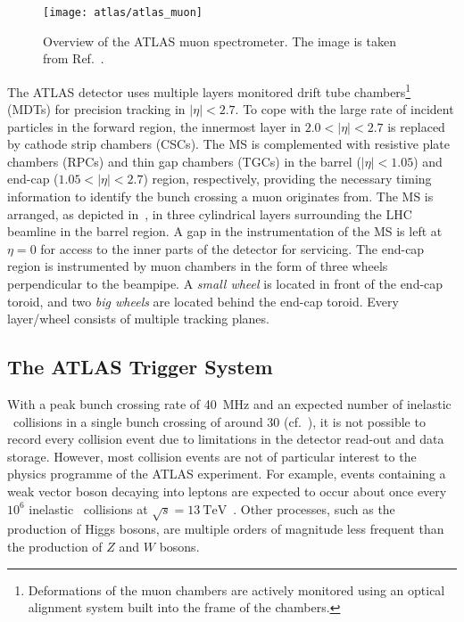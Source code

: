 \begin{figure}[htbp]
  \centering

  \texttt{[image: atlas/atlas\_muon]}

  \caption[Overview of the ATLAS muon spectrometer.]{Overview of the ATLAS muon
    spectrometer. The image is taken from Ref.~\cite{PERF-2007-01}.}%
  \label{fig:atlas_muon_system}
\end{figure}

The ATLAS detector uses multiple layers monitored drift tube
chambers\footnote{Deformations of the muon chambers are actively monitored using
  an optical alignment system built into the frame of the chambers.} (MDTs) for
precision tracking in $|\eta| < 2.7$. To cope with the large rate of incident
particles in the forward region, the innermost layer in $2.0 < |\eta| < 2.7$ is
replaced by cathode strip chambers (CSCs). The MS is complemented with resistive
plate chambers (RPCs) and thin gap chambers (TGCs) in the barrel
($|\eta| < 1.05$) and end-cap ($1.05 < |\eta| < 2.7$) region, respectively,
providing the necessary timing information to identify the bunch crossing a muon
originates from. The MS is arranged, as depicted
in~, in three cylindrical layers surrounding the LHC
beamline in the barrel region. A gap in the instrumentation of the MS is left at
$\eta = 0$ for access to the inner parts of the detector for servicing. The
end-cap region is instrumented by muon chambers in the form of three wheels
perpendicular to the beampipe. A \emph{small wheel} is located in front of the
end-cap toroid, and two \emph{big wheels} are located behind the end-cap
toroid. Every layer/wheel consists of multiple tracking planes.


\subsection{The ATLAS Trigger System}%
\label{sec:atlas_trigger}

With a peak bunch crossing rate of \SI{40}{\mega\hertz} and an expected number
of inelastic \pp~collisions in a single bunch crossing of around \num{30} (cf.\
), it is not possible to record every collision event due
to limitations in the detector read-out and data storage. However, most
collision events are not of particular interest to the physics programme of the
ATLAS experiment. For example, events containing a weak vector boson decaying
into leptons are expected to occur about once every $10^6$ inelastic
\pp~collisions at $\sqrt{s} = \SI{13}{\TeV}$~\cite{STDM-2015-03}. Other
processes, such as the production of Higgs bosons, are multiple orders of
magnitude less frequent than the production of $Z$ and $W$ bosons.

